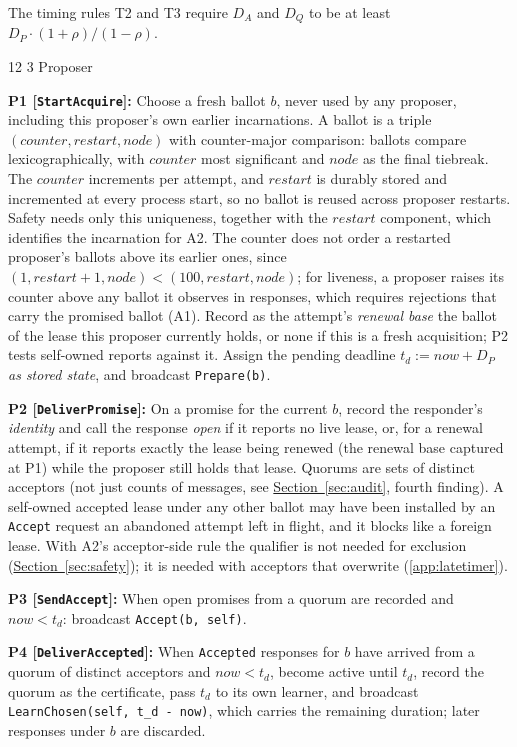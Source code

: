 \documentclass[final,5p,times,twocolumn,number]{elsarticle}
\makeatletter
\newcommand{\code}[1]{\texttt{#1}}
\newcommand{\invitem}[1]{\smallskip\noindent\textbf{#1:} }
\newcommand{\secref}[1]{\hyperref[#1]{Section~\ref*{#1}}}
\renewcommand\subsection{\@startsection{subsection}{2}{\z@}%
           {12\p@ \@plus 6\p@ \@minus 3\p@}%
           {3\p@ \@plus 6\p@ \@minus 3\p@}%
           {\normalfont\normalsize\bfseries}}
\makeatother
\begin{document}
The timing rules T2 and T3 require $D_A$ and $D_Q$ to be at least $D_P \cdot (1+\rho)/(1-\rho)$.

\subsection{Proposer}

\invitem{P1 [\code{StartAcquire}]}Choose a fresh ballot $b$, never used by any proposer, including this proposer's own earlier incarnations.  A ballot is a triple $(counter, restart, node)$ with counter-major comparison: ballots compare lexicographically, with $counter$ most significant and $node$ as the final tiebreak.  The $counter$ increments per attempt, and $restart$ is durably stored and incremented at every process start, so no ballot is reused across proposer restarts.  Safety needs only this uniqueness, together with the $restart$ component, which identifies the incarnation for A2.  The counter does not order a restarted proposer's ballots above its earlier ones, since $(1, restart{+}1, node) < (100, restart, node)$; for liveness, a proposer raises its counter above any ballot it observes in responses, which requires rejections that carry the promised ballot (A1).  Record as the attempt's \emph{renewal base} the ballot of the lease this proposer currently holds, or none if this is a fresh acquisition; P2 tests self-owned reports against it.  Assign the pending deadline $t_d := now + D_P$ \emph{as stored state}, and broadcast \code{Prepare(b)}.

\invitem{P2 [\code{DeliverPromise}]}On a promise for the current $b$, record the responder's \emph{identity} and call the response \emph{open} if it reports no live lease, or, for a renewal attempt, if it reports exactly the lease being renewed (the renewal base captured at P1) while the proposer still holds that lease.  Quorums are sets of distinct acceptors (not just counts of messages, see \secref{sec:audit}, fourth finding).  A self-owned accepted lease under any other ballot may have been installed by an \code{Accept} request an abandoned attempt left in flight, and it blocks like a foreign lease.  With A2's acceptor-side rule the qualifier is not needed for exclusion (\secref{sec:safety}); it is needed with acceptors that overwrite (\ref{app:latetimer}).

\invitem{P3 [\code{SendAccept}]}When open promises from a quorum are recorded and $now < t_d$: broadcast \code{Accept(b, self)}.

\invitem{P4 [\code{DeliverAccepted}]}When \code{Accepted} responses for $b$ have arrived from a quorum of distinct acceptors and $now < t_d$, become active until $t_d$, record the quorum as the certificate, pass $t_d$ to its own learner, and broadcast \code{LearnChosen(self, t\_d - now)}, which carries the remaining duration; later responses under $b$ are discarded.
\end{document}
